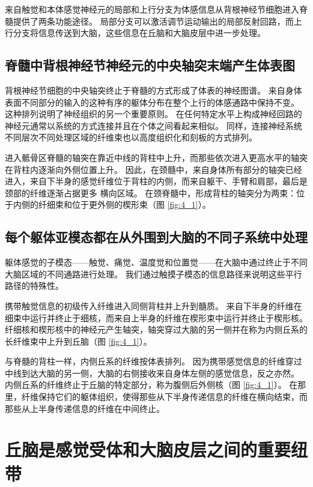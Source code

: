 来自触觉和本体感觉神经元的局部和上行分支为体感信息从背根神经节细胞进入脊髓提供了两条功能途径。 
局部分支可以激活调节运动输出的局部反射回路，而上行分支将信息传送到大脑，这些信息在丘脑和大脑皮层中进一步处理。



\subsection{脊髓中背根神经节神经元的中央轴突末端产生体表图}

背根神经节细胞的中央轴突终止于脊髓的方式形成了体表的神经图谱。
来自身体表面不同部分的输入的这种有序的躯体分布在整个上行的体感通路中保持不变。
这种排列说明了神经组织的另一个重要原则。
在任何特定水平上构成神经回路的神经元通常以系统的方式连接并且在个体之间看起来相似。 
同样，连接神经系统不同层次不同处理区域的纤维束也以高度组织化和刻板的方式排列。


进入骶骨区脊髓的轴突在靠近中线的背柱中上升，而那些依次进入更高水平的轴突在背柱内逐渐向外侧位置上升。 
因此，在颈髓中，来自身体所有部分的轴突已经进入，来自下半身的感觉纤维位于背柱的内侧，而来自躯干、手臂和肩部，最后是颈部的纤维逐渐占据更多 横向区域。 
在颈脊髓中，形成背柱的轴突分为两束：位于内侧的纤细束和位于更外侧的楔形束（图 \ref{fig:4_1}）。


\subsection{每个躯体亚模态都在从外围到大脑的不同子系统中处理}

躯体感觉的子模态——触觉、痛觉、温度觉和位置觉——在大脑中通过终止于不同大脑区域的不同通路进行处理。 
我们通过触摸子模态的信息路径来说明这些平行路径的特殊性。


携带触觉信息的初级传入纤维进入同侧背柱并上升到髓质。 
来自下半身的纤维在细束中运行并终止于细核，而来自上半身的纤维在楔形束中运行并终止于楔形核。 
纤细核和楔形核中的神经元产生轴突，轴突穿过大脑的另一侧并在称为内侧丘系的长纤维束中上升到丘脑（图 \ref{fig:4_1}）。


与脊髓的背柱一样，内侧丘系的纤维按体表排列。 因为携带感觉信息的纤维穿过中线到达大脑的另一侧，大脑的右侧接收来自身体左侧的感觉信息，反之亦然。 
内侧丘系的纤维终止于丘脑的特定部分，称为腹侧后外侧核（图 \ref{fig:4_1}）。 
在那里，纤维保持它们的躯体组织，使得那些从下半身传递信息的纤维在横向结束，而那些从上半身传递信息的纤维在中间终止。


\section{丘脑是感觉受体和大脑皮层之间的重要纽带}

